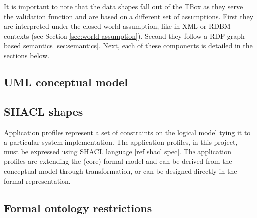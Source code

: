 	It is important to note that the data shapes fall out of the TBox as they serve the validation function and are based on a different set of assumptions. First they are interpreted under the closed world assumption, like in XML  or RDBM contexts (see Section \ref{sec:world-assumption}). Second they follow a RDF graph based semantics \ref{sec:semantics}.
	Next, each of these components is detailed in the sections below.
	
	\subsection{UML conceptual model}
	\label{sec:uml-model}
	
	
	
	\subsection{SHACL shapes}
	\label{sec:shapes}
	
	Application profiles represent a set of constraints on the logical model tying it to a particular system implementation. The application profiles, in this project, must be expressed using SHACL language [ref shacl spec]. The application profiles are extending the (core) formal model and can be derived from the conceptual model through transformation, or can be designed directly in the formal representation. 
	
	\subsection{Formal ontology restrictions}
	\label{sec:restrictions}
	
